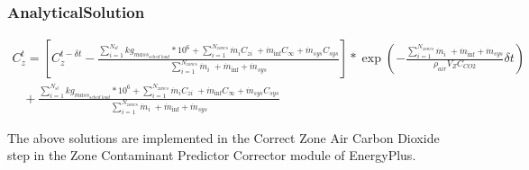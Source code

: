 \subsubsection{AnalyticalSolution}\label{analyticalsolution-1}

\begin{equation}
\begin{array}{l}C_z^t = \left[ {C_z^{t - \delta t} - \frac{{\sum\limits_{i = 1}^{{N_{sl}}} {k{g_{mas{s_{sched\;load}}}}*{{10}^6}}  + \sum\limits_{i = 1}^{{N_{zones}}} {{{\dot m}_i}} {C_{zi}}\; + {{\dot m}_{\inf }}{C_\infty } + {{\dot m}_{sys}}{C_{sys}}}}{{\sum\limits_{i = 1}^{{N_{zones}}} {{{\dot m}_i}} \; + {{\dot m}_{\inf }} + {{\dot m}_{sys}}}}} \right]*\exp \left( { - \frac{{\sum\limits_{i = 1}^{{N_{zones}}} {{{\dot m}_i}} \; + {{\dot m}_{\inf }} + {{\dot m}_{sys}}}}{{{\rho_{air}}{V_Z}{C_{CO2}}}}\delta t} \right) \\
\;\;\; + \frac{{\sum\limits_{i = 1}^{{N_{sl}}} {k{g_{mas{s_{sched\;load}}}}*{{10}^6}}  + \sum\limits_{i = 1}^{{N_{zones}}} {{{\dot m}_i}} {C_{zi}}\; + {{\dot m}_{\inf }}{C_\infty } + {{\dot m}_{sys}}{C_{sys}}}}{{\sum\limits_{i = 1}^{{N_{zones}}} {{{\dot m}_i}} \; + {{\dot m}_{\inf }} + {{\dot m}_{sys}}}}\end{array}
\end{equation}

The above solutions are implemented in the Correct Zone Air Carbon Dioxide step in the Zone Contaminant Predictor Corrector module of EnergyPlus.
